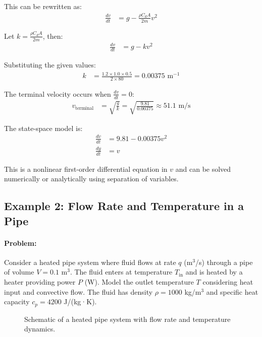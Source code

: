 \documentclass[11pt,a4paper]{article}
\begin{document}
This can be rewritten as:
\begin{align}
\frac{dv}{dt} &= g - \frac{\rho C_d A}{2m} v^2
\end{align}

Let $k = \frac{\rho C_d A}{2m}$, then:
\begin{align}
\frac{dv}{dt} &= g - kv^2
\end{align}

Substituting the given values:
\begin{align}
k &= \frac{1.2 \times 1.0 \times 0.5}{2 \times 80} = 0.00375 \text{ m}^{-1}
\end{align}

The terminal velocity occurs when $\frac{dv}{dt} = 0$:
\begin{align}
v_{\text{terminal}} &= \sqrt{\frac{g}{k}} = \sqrt{\frac{9.81}{0.00375}} \approx 51.1 \text{ m/s}
\end{align}

The state-space model is:
\begin{align}
\frac{dv}{dt} &= 9.81 - 0.00375v^2 \\
\frac{dy}{dt} &= v
\end{align}

This is a nonlinear first-order differential equation in $v$ and can be solved numerically or analytically using separation of variables.

\subsection{Example 2: Flow Rate and Temperature in a Pipe}

\paragraph{Problem:} Consider a heated pipe system where fluid flows at rate $q$ (m$^3$/s) through a pipe of volume $V = 0.1$ m$^3$. The fluid enters at temperature $T_{\text{in}}$ and is heated by a heater providing power $P$ (W). Model the outlet temperature $T$ considering heat input and convective flow. The fluid has density $\rho = 1000$ kg/m$^3$ and specific heat capacity $c_p = 4200$ J/(kg·K).

\begin{figure}[h]
\centering
{}
\caption{Schematic of a heated pipe system with flow rate and temperature dynamics.}
\end{figure}
\end{document}
